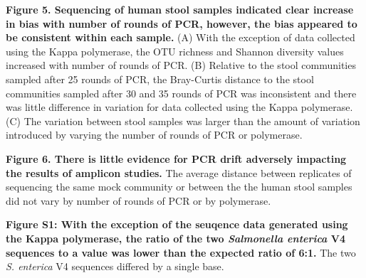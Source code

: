 \documentclass[11pt,]{article}
\begin{document}
\textbf{Figure 5. Sequencing of human stool samples indicated clear
increase in bias with number of rounds of PCR, however, the bias
appeared to be consistent within each sample.} (A) With the exception of
data collected using the Kappa polymerase, the OTU richness and Shannon
diversity values increased with number of rounds of PCR. (B) Relative to
the stool communities sampled after 25 rounds of PCR, the Bray-Curtis
distance to the stool communities sampled after 30 and 35 rounds of PCR
was inconsistent and there was little difference in variation for data
collected using the Kappa polymerase. (C) The variation between stool
samples was larger than the amount of variation introduced by varying
the number of rounds of PCR or polymerase.

\textbf{Figure 6. There is little evidence for PCR drift adversely
impacting the results of amplicon studies.} The average distance between
replicates of sequencing the same mock community or between the the
human stool samples did not vary by number of rounds of PCR or by
polymerase.

\textbf{Figure S1: With the exception of the seuqence data generated
using the Kappa polymerase, the ratio of the two \emph{Salmonella
enterica} V4 sequences to a value was lower than the expected ratio of
6:1.} The two \emph{S. enterica} V4 sequences differed by a single base.
\end{document}

